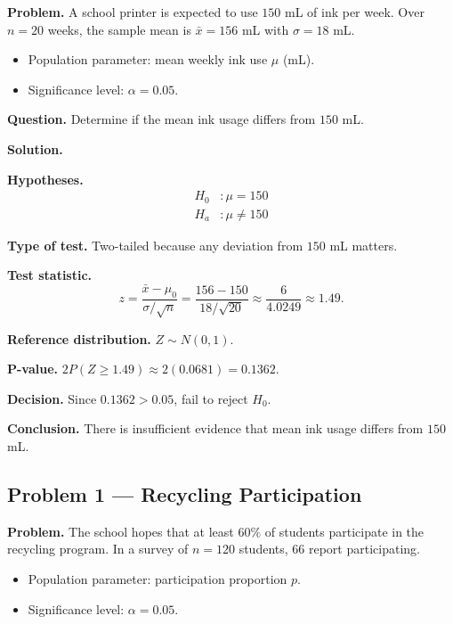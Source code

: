 	\textbf{Problem.} A school printer is expected to use $150$ mL of ink per week. Over $n=20$ weeks, the sample mean is $\bar{x}=156$ mL with $\sigma=18$ mL.
	\begin{itemize}
		\item Population parameter: mean weekly ink use $\mu$ (mL).
		\item Significance level: $\alpha=0.05$.
	\end{itemize}
	
	\textbf{Question.} Determine if the mean ink usage differs from $150$ mL.
	
	\textbf{Solution.}
	
	\textbf{Hypotheses.}
	\[
	\begin{aligned}
		H_0&: \mu = 150 \\
		H_a&: \mu \neq 150
	\end{aligned}
	\]
	
	\textbf{Type of test.} Two-tailed because any deviation from $150$ mL matters.
	
	\textbf{Test statistic.}
	\[
	z = \frac{\bar{x}-\mu_0}{\sigma/\sqrt{n}} = \frac{156-150}{18/\sqrt{20}} \approx \frac{6}{4.0249} \approx 1.49.
	\]
	
	\textbf{Reference distribution.} $Z \sim N(0,1)$.
	
	\textbf{P-value.} $2P(Z\ge 1.49)\approx 2(0.0681)=0.1362$.
	
	\textbf{Decision.} Since $0.1362>0.05$, fail to reject $H_0$.
	
	\textbf{Conclusion.} There is insufficient evidence that mean ink usage differs from $150$ mL.
	
	
	\hypertarget{c6-ex1}{}
	\subsection*{Problem 1 — Recycling Participation}
	
	\textbf{Problem.} The school hopes that at least $60\%$ of students participate in the recycling program. In a survey of $n=120$ students, $66$ report participating.
	\begin{itemize}
		\item Population parameter: participation proportion $p$.
		\item Significance level: $\alpha=0.05$.
	\end{itemize}
	

